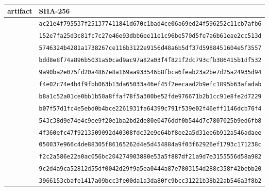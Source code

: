 \documentclass[10pt]{article}
\newcommand{\sha}[1]{\nolinkurl{#1}}
\begin{document}
\begin{longtable}{L{.55\linewidth}L{.39\linewidth}}
\toprule
artifact & SHA-256\\
\midrule
\endhead
{}
& \sha{ac21e4f795537f251377411841d670c1bad4ce06a69ed24f596252c11cb7afb6}\\
& \sha{152e7fa25d3c81fc7c27e46e93dbb6ee11e1c96be570d5fe7a6b61eae2cc513d}\\
& \sha{5746324b4281a1738267ce116b3122e9156d48a6b5df37d5988451604e5f3557}\\
& \sha{bdd8e8f74a896b5031a50cad9ac97a82a03f4f821f2dc793cfb386415b1df532}\\
& \sha{9a90ba2e075fd20a4867e8a169aa933546b8fbca6feab23a2be7d25a24935d94}\\
& \sha{f4e02c74e4b4f9fbb063b13da65033a46ef45f2eecaad2b9efc1895b63afadab}\\
& \sha{b8a1c52a01ce0bb1b50a8ffaf78f5a300be52fde976671b2b1cc91e8fe2d7229}\\
& \sha{b07f57d1fc4e5ebd0b4bce2261931fa64399c791f539e02f46eff1146dcb76f4}\\
& \sha{543c38d9e74e4c9ee9f20e1ba2bd2de80e0476ddf0b544d7c7807025b9ed6fb8}\\
& \sha{4f360efc47f9213509092d40308fdc32e9e64bf8ee2a5d31ee6b912a546adaee}\\
& \sha{050037e966c4de88305f86165262d4e5d454884a9f03f62926ef1793c171238c}\\
& \sha{f2c2a586e22a0ac056bc204274903880e53a5f887df21a9d7e3155556d58a982}\\
& \sha{9c2d4a9ca52812d55df0042d29f9a5ea0444a87e7803154d288c358f42bebb20}\\
& \sha{3966153cbafe1417a09bcc3fe00da1a3da80fc9bcc31221b38b22ab546a3f8b2}\\

\end{longtable}
\end{document}
